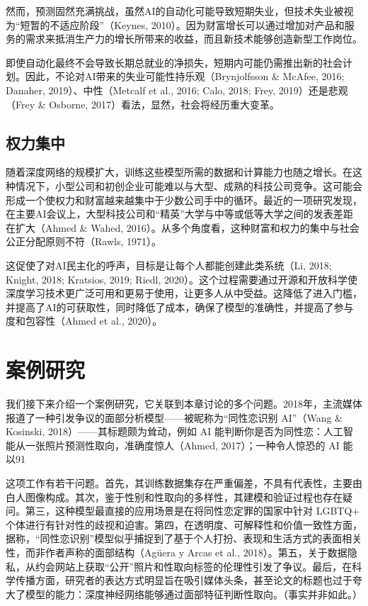 然而，预测固然充满挑战，虽然AI的自动化可能导致短期失业，但技术失业被视为“短暂的不适应阶段”（Keynes, 2010）。因为财富增长可以通过增加对产品和服务的需求来抵消生产力的增长所带来的收益，而且新技术能够创造新型工作岗位。

即使自动化最终不会导致长期总就业的净损失，短期内可能仍需推出新的社会计划。因此，不论对AI带来的失业可能性持乐观（Brynjolfsson \& McAfee, 2016; Danaher, 2019）、中性（Metcalf et al., 2016; Calo, 2018; Frey, 2019）还是悲观（Frey \& Osborne, 2017）看法，显然，社会将经历重大变革。

\subsection{权力集中}
随着深度网络的规模扩大，训练这些模型所需的数据和计算能力也随之增长。在这种情况下，小型公司和初创企业可能难以与大型、成熟的科技公司竞争。这可能会形成一个使权力和财富越来越集中于少数公司手中的循环。最近的一项研究发现，在主要AI会议上，大型科技公司和“精英”大学与中等或低等大学之间的发表差距在扩大（Ahmed \& Wahed, 2016）。从多个角度看，这种财富和权力的集中与社会公正分配原则不符（Rawls, 1971）。

这促使了对AI民主化的呼声，目标是让每个人都能创建此类系统（Li, 2018; Knight, 2018; Kratsios, 2019; Riedl, 2020）。这个过程需要通过开源和开放科学使深度学习技术更广泛可用和更易于使用，让更多人从中受益。这降低了进入门槛，并提高了AI的可获取性，同时降低了成本，确保了模型的准确性，并提高了参与度和包容性（Ahmed et al., 2020）。

\section{案例研究}
我们接下来介绍一个案例研究，它关联到本章讨论的多个问题。2018年，主流媒体报道了一种引发争议的面部分析模型——被昵称为“同性恋识别 AI”（Wang \& Kosinski, 2018）——其标题颇为耸动，例如 AI 能判断你是否为同性恋：人工智能从一张照片预测性取向，准确度惊人（Ahmed, 2017）；一种令人惊恐的 AI 能以91%

这项工作有若干问题。首先，其训练数据集存在严重偏差，不具有代表性，主要由白人图像构成。其次，鉴于性别和性取向的多样性，其建模和验证过程也存在疑问。第三，这种模型最直接的应用场景是在将同性恋定罪的国家中针对 LGBTQ+ 个体进行有针对性的歧视和迫害。第四，在透明度、可解释性和价值一致性方面，据称，“同性恋识别”模型似乎捕捉到了基于个人打扮、表现和生活方式的表面相关性，而非作者声称的面部结构（Agüera y Arcas et al., 2018）。第五，关于数据隐私，从约会网站上获取“公开”照片和性取向标签的伦理性引发了争议。最后，在科学传播方面，研究者的表达方式明显旨在吸引媒体头条，甚至论文的标题也过于夸大了模型的能力：深度神经网络能够通过面部特征判断性取向。（事实并非如此。）

